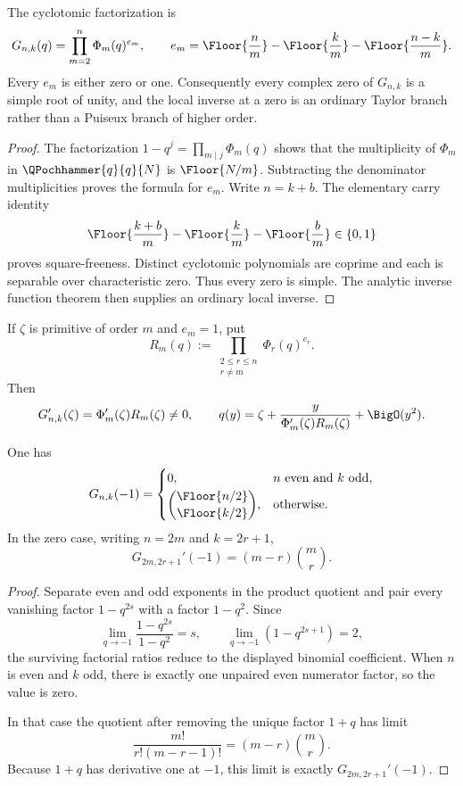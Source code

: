 \begin{theorem}
\label{thm:gq-square-free}
The cyclotomic factorization is
\[
  G_{n,k}(q)=\prod_{m=2}^{n}\Phi_m(q)^{e_m},
  \qquad
  e_m=\Floor{\frac nm}
      -\Floor{\frac km}
      -\Floor{\frac{n-k}{m}}.
\]
Every \(e_m\) is either zero or one.  Consequently every complex zero of
\(G_{n,k}\) is a simple root of unity, and the local inverse at a zero is an
ordinary Taylor branch rather than a Puiseux branch of higher order.
\end{theorem}

\begin{proof}
The factorization \(1-q^j=\prod_{m\mid j}\Phi_m(q)\) shows that the
multiplicity of \(\Phi_m\) in \(\QPochhammer{q}{q}{N}\) is
\(\Floor{N/m}\).
Subtracting the denominator multiplicities proves the formula for \(e_m\).
Write \(n=k+b\).  The elementary carry identity
\[
  \Floor{\frac{k+b}{m}}
  -\Floor{\frac{k}{m}}
  -\Floor{\frac{b}{m}}\in\{0,1\}
\]
proves square-freeness.  Distinct cyclotomic polynomials are coprime and each
is separable over characteristic zero.  Thus every zero is simple.  The
analytic inverse function theorem then supplies an ordinary local inverse.
\end{proof}

If \(\zeta\) is primitive of order \(m\) and \(e_m=1\), put
\[
  R_m(q):=\prod_{\substack{2\le r\le n\\r\ne m}}\Phi_r(q)^{e_r}.
\]
Then
\[
  G_{n,k}'(\zeta)=\Phi_m'(\zeta)R_m(\zeta)\ne0,
  \qquad
  q(y)=\zeta+
  \frac{y}{\Phi_m'(\zeta)R_m(\zeta)}+\BigO(y^2).
\]

\begin{proposition}[Value and zero derivative at \(q=-1\)]
\label{prop:gq-minus-one}
One has
\[
  G_{n,k}(-1)=
  \begin{cases}
  0,&n\text{ even and }k\text{ odd},\\[0.25em]
  \displaystyle
  \binom{\Floor{n/2}}{\Floor{k/2}},
  &\text{otherwise}.
  \end{cases}
\]
In the zero case, writing \(n=2m\) and \(k=2r+1\),
\[
  G_{2m,2r+1}'(-1)=(m-r)\binom mr.
\]
\end{proposition}

\begin{proof}
Separate even and odd exponents in the product quotient and pair every
vanishing factor \(1-q^{2s}\) with a factor \(1-q^2\).  Since
\[
  \lim_{q\to-1}\frac{1-q^{2s}}{1-q^2}=s,
  \qquad
  \lim_{q\to-1}(1-q^{2s+1})=2,
\]
the surviving factorial ratios reduce to the displayed binomial coefficient.
When \(n\) is even and \(k\) odd, there is exactly one unpaired even numerator
factor, so the value is zero.

In that case the quotient after removing the unique factor \(1+q\) has limit
\[
  \frac{m!}{r!(m-r-1)!}=(m-r)\binom mr.
\]
Because \(1+q\) has derivative one at \(-1\), this limit is exactly
\(G_{2m,2r+1}'(-1)\).
\end{proof}

